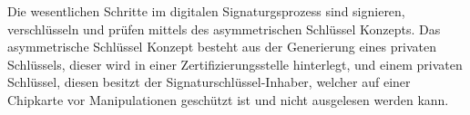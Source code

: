 Die wesentlichen Schritte im digitalen Signaturgsprozess sind signieren, verschlüsseln und prüfen mittels des asymmetrischen Schlüssel Konzepts. Das asymmetrische Schlüssel Konzept besteht aus der Generierung eines privaten Schlüssels, dieser wird in einer Zertifizierungsstelle hinterlegt, und einem privaten Schlüssel, diesen besitzt der Signaturschlüssel-Inhaber, welcher auf einer Chipkarte vor Manipulationen geschützt ist und nicht ausgelesen werden kann. \cite{techno1} 